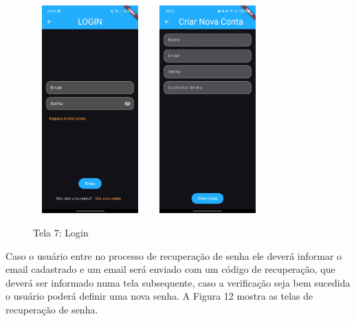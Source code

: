     \begin{figure}[h]
        \centering
        \includegraphics[width=44mm,height=80mm]{imagens/login.jpg}
        \hspace{10mm}
        \includegraphics[width=44mm,height=80mm]{imagens/registrar.jpg} %
        \caption{\scriptsize Tela 7: Login}
        \label{fig:tela7}
    \end{figure}

    \FloatBarrier
    
    Caso o usuário entre no processo de recuperação de senha ele deverá informar o email cadastrado e um email será enviado com um código de recuperação, que deverá ser informado numa tela subsequente, caso a verificação seja bem sucedida o usuário poderá definir uma nova senha. A Figura 12 mostra as telas de recuperação de senha.
    
    \FloatBarrier

